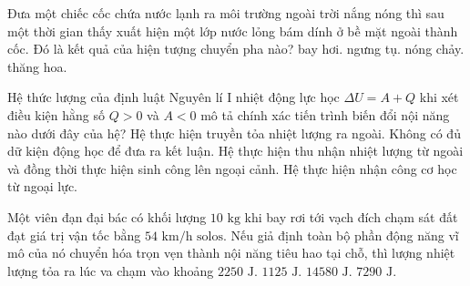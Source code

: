 \begin{ex}%
	Đưa một chiếc cốc chứa nước lạnh ra môi trường ngoài trời nắng nóng thì sau một thời gian thấy xuất hiện một lớp nước lỏng bám dính ở bề mặt ngoài thành cốc. Đó là kết quả của hiện tượng chuyển pha nào?
	\choice
	{bay hơi.}
	{\True ngưng tụ.}
	{nóng chảy.}
	{thăng hoa.}
\end{ex}

\begin{ex}%
	Hệ thức lượng của định luật Nguyên lí I nhiệt động lực học $\Delta U = A + Q$ khi xét điều kiện hằng số $Q > 0$ và $A < 0$ mô tả chính xác tiến trình biến đổi nội năng nào dưới đây của hệ?
	\choice
	{Hệ thực hiện truyền tỏa nhiệt lượng ra ngoài.}
	{Không có đủ dữ kiện động học để đưa ra kết luận.}
	{\True Hệ thực hiện thu nhận nhiệt lượng từ ngoài và đồng thời thực hiện sinh công lên ngoại cảnh.}
	{Hệ thực hiện nhận công cơ học từ ngoại lực.}
\end{ex}

\begin{ex}%
	Một viên đạn đại bác có khối lượng $10\text{ kg}$ khi bay rơi tới vạch đích chạm sát đất đạt giá trị vận tốc bằng $54\text{ km/h solos}$. Nếu giả định toàn bộ phần động năng vĩ mô của nó chuyển hóa trọn vẹn thành nội năng tiêu hao tại chỗ, thì lượng nhiệt lượng tỏa ra lúc va chạm vào khoảng
	\choice
	{$2250\text{ J}$.}
	{\True $1125\text{ J}$.}
	{$14580\text{ J}$.}
	{$7290\text{ J}$.}
\end{ex}

